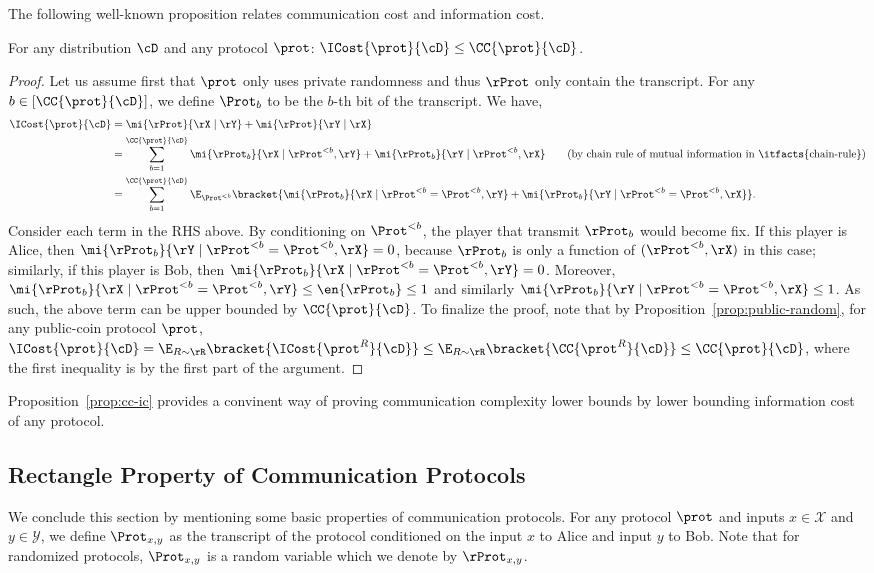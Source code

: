 The following well-known proposition relates communication cost and information cost. 
\begin{proposition}\label{prop:cc-ic}
  For any distribution $\cD$ and any protocol $\prot$: $\ICost{\prot}{\cD} \leq \CC{\prot}{\cD}$.
\end{proposition}
\begin{proof}
Let us assume first that $\prot$ only uses private randomness and thus $\rProt$ only contain the transcript.  
For any $b \in [\CC{\prot}{\cD}]$, we define $\Prot_b$ to be the $b$-th bit of the transcript. We have, 
\begin{align*}
	 \ICost{\prot}{\cD} &= \mi{\rProt}{\rX \mid \rY}+ \mi{\rProt }{\rY \mid \rX} \\
	 &= \sum_{b=1}^{\CC{\prot}{\cD}} \mi{\rProt_b}{\rX \mid \rProt^{<b},\rY} + \mi{\rProt_b}{\rY \mid \rProt^{<b},\rX} \tag{by chain rule of mutual information in \itfacts{chain-rule}}\\
	 &= \sum_{b=1}^{\CC{\prot}{\cD}} \E_{\Prot^{<b}}\bracket{\mi{\rProt_b}{\rX \mid \rProt^{<b} = \Prot^{<b},\rY} + \mi{\rProt_b}{\rY \mid \rProt^{<b}= \Prot^{<b},\rX}}.
\end{align*}
Consider each term in the RHS above. By conditioning on $\Prot^{<b}$, the player that transmit $\rProt_b$ would become fix. If this player is Alice, then $\mi{\rProt_b}{\rY \mid \rProt^{<b}= \Prot^{<b},\rX} = 0$, because
$\rProt_b$ is only a function of $(\rProt^{<b},\rX)$ in this case; similarly, if this player is Bob, then $\mi{\rProt_b}{\rX \mid \rProt^{<b}= \Prot^{<b},\rY} = 0$. Moreover, 
$\mi{\rProt_b}{\rX \mid \rProt^{<b} = \Prot^{<b},\rY} \leq \en{\rProt_b}  \leq 1$ and similarly $\mi{\rProt_b}{\rY \mid \rProt^{<b}= \Prot^{<b},\rX} \leq 1$. As such, the above term can be upper bounded 
by $\CC{\prot}{\cD}$. To finalize the proof, note that by Proposition~\ref{prop:public-random}, for any public-coin protocol $\prot$, $\ICost{\prot}{\cD} = \E_{R \sim \rR}\bracket{\ICost{\prot^R}{\cD}} \leq \E_{R \sim \rR}\bracket{\CC{\prot^R}{\cD}} \leq \CC{\prot}{\cD}$, where
the first inequality is by the first part of the argument.  
\end{proof}

Proposition~\ref{prop:cc-ic} provides a convinent way of proving communication complexity lower bounds by lower bounding information cost of any protocol. 


\subsection*{Rectangle Property of Communication Protocols}\label{sec:statstics}
We conclude this section by mentioning some basic properties of communication protocols. For any protocol $\prot$ and inputs $x \in \mathcal{X}$ and $y \in \mathcal{Y}$, we define $\Prot_{x,y}$ as the transcript
of the protocol conditioned on the input $x$ to Alice and input $y$ to Bob. Note that for randomized protocols, $\Prot_{x,y}$ is a random variable which we denote by $\rProt_{x,y}$. 

